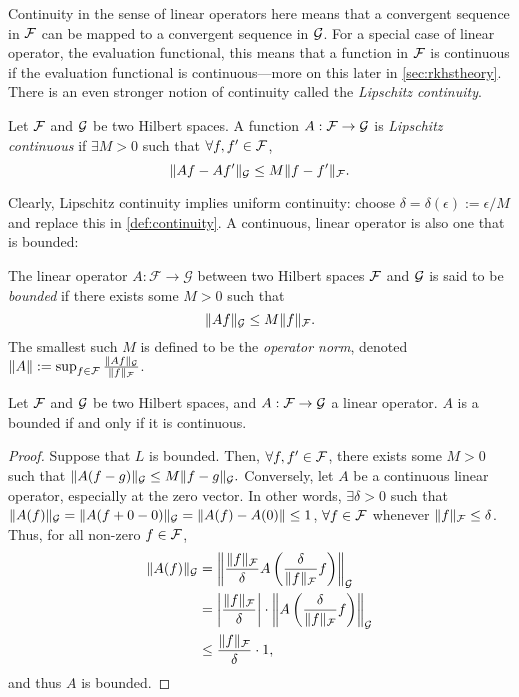 Continuity in the sense of linear operators here means that a convergent sequence in ${\mathcal F}$ can be mapped to a convergent sequence in ${\mathcal G}$.
For a special case of linear operator, the evaluation functional, this means that a function in ${\mathcal F}$ is continuous if the evaluation functional is continuous---more on this later in  \cref{sec:rkhstheory}.
There is an even stronger notion of continuity called the \emph{Lipschitz continuity}.

\begin{definition}
  Let ${\mathcal F}$ and ${\mathcal G}$ be two Hilbert spaces.  
  A function $A:{\mathcal F}\to{\mathcal G}$ is \emph{Lipschitz continuous} if $\exists M >0$ such that $\forall f,f'\in{\mathcal F}$,
  \[
    \lVert Af - Af'\rVert_{\mathcal G} \leq M \lVert f - f'\rVert_{\mathcal F}.
  \]
\end{definition}

Clearly, Lipschitz continuity implies uniform continuity: choose $\delta = \delta(\epsilon) := \epsilon/M$ and replace this in  \cref{def:continuity}.
A continuous, linear operator is also one that is bounded:

\begin{definition}\label{def:boundedop}
  The linear operator $A:\mathcal F \rightarrow \mathcal G$ between two Hilbert spaces ${\mathcal F}$ and ${\mathcal G}$ is said to be \emph{bounded} if there exists some $M>0$ such that
  \[
    \lVert Af\rVert_{\mathcal G} \leq M \lVert f\rVert_{\mathcal F}.
  \] 
  The smallest such $M$ is defined to be the \emph{operator norm}, denoted $\lVert A\rVert := \sup_{f\in{\mathcal F}} \frac{\lVert Af\rVert_{\mathcal G}}{\lVert f\rVert_{\mathcal F}}$.
\end{definition}

\begin{lemma}\label{thm:boundcont}
  Let ${\mathcal F}$ and ${\mathcal G}$ be two Hilbert spaces, and $A:{\mathcal F}\to{\mathcal G}$ a linear operator.
  $A$ is a bounded if and only if it is continuous.
\end{lemma}

\begin{proof}
  Suppose that $L$ is bounded.
  Then, $\forall f,f' \in {\mathcal F}$, there exists some $M>0$ such that $\lVert A(f-g)\rVert_{\mathcal G} \leq M \lVert f-g\rVert_{\mathcal G}.$
  Conversely, let $A$ be a continuous linear operator, especially at the zero vector.
  In other words, $\exists \delta > 0$ such that $\lVert A(f)\rVert_{\mathcal G} = \lVert A(f+0-0)\rVert_{\mathcal G} = \lVert A(f) - A(0)\rVert \leq 1$, $\forall f\in{\mathcal F}$ whenever $\lVert f\rVert_{\mathcal F} \leq \delta$.
  Thus, for all non-zero $f \in{\mathcal F}$,
  \begin{align*}
    \lVert A(f)\rVert_{\mathcal G} &= \left\Vert \frac{\lVert f\rVert_{\mathcal F}}{\delta} A\left(\frac{\delta}{\lVert f\rVert_{\mathcal F}}f\right)\right\Vert_{\mathcal G} \\
    &= \left\vert \frac{\lVert f\rVert_{\mathcal F}}{\delta}\right\vert \cdot \left\Vert A\left(\frac{\delta}{\lVert f\rVert_{\mathcal F}}f\right)\right\Vert_{\mathcal G} \\    
    &\leq \frac{\lVert f\rVert_{\mathcal F}}{\delta} \cdot 1,
  \end{align*}
  and thus $A$ is bounded.
\end{proof}

